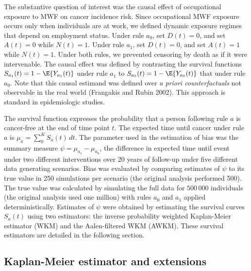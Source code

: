 \documentclass[
  11pt,
]{article}
\begin{document}
The substantive question of interest was the causal effect of
occupational exposure to MWF on cancer incidence risk. Since
occupational MWF exposure occurs only when individuals are at work, we
defined dynamic exposure regimes that depend on employment status. Under
rule \(a_0\), set \(D(t) = 0\), and set \(A(t) = 0\) while \(N(t) = 1\).
Under rule \(a_1\), set \(D(t) = 0\), and set \(A(t) = 1\) while
\(N(t) = 1\). Under both rules, we prevented censoring by death as if it
were intervenable. The causal effect was defined by contrasting the
survival functions \(S_{a_1}(t) = 1 - \E{Y_{a_1}(t)}\) under rule
\(a_1\) to \(S_{a_0}(t) = 1 - \E{Y_{a_0}(t)}\) that under rule \(a_0\).
Note that this causal estimand was defined over \emph{a priori
counterfactuals} not observable in the real world (Frangakis and Rubin
2002). This approach is standard in epidemiologic studies.

The survival function expresses the probability that a person following
rule \(a\) is cancer-free at the end of time point \(t\). The expected
time until cancer under rule \(a\) is
\(\mu_{a} = \sum_0^K S_{a}(t) \, dt\). The parameter used in the
estimation of bias was the summary measure
\(\psi = \mu_{a_1} - \mu_{a_0}\), the difference in expected time until
event under two different interventions over 20 years of follow-up under
five different data generating scenarios. Bias was evaluated by
comparing estimates of \(\psi\) to its true value in 250 simulations per
scenario (the original analysis performed 500). The true value was
calculated by simulating the full data for \(500\,000\) individuals (the
original analysis used one million) with rules \(a_0\) and \(a_1\)
applied deterministically. Estimates of \(\psi\) were obtained by
estimating the survival curves \(S_a(t)\) using two estimators: the
inverse probability weighted Kaplan-Meier estimator (WKM) and the
Aalen-filtered WKM (AWKM). These survival estimators are detailed in the
following section.

\hypertarget{kaplan-meier-estimator-and-extensions}{%
\subsection{Kaplan-Meier estimator and
extensions}\label{kaplan-meier-estimator-and-extensions}}
\end{document}
